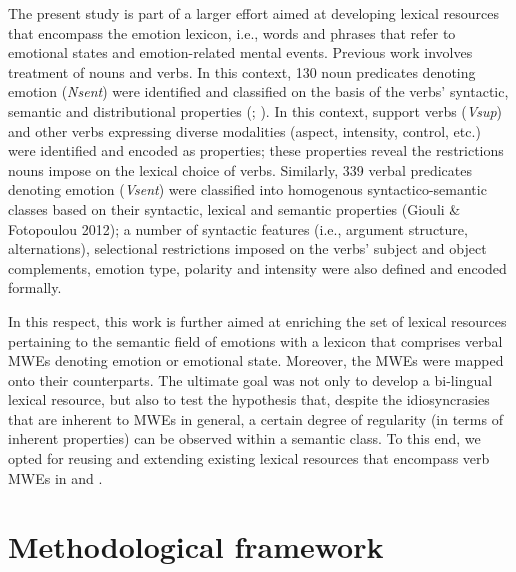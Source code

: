 \documentclass[output=paper]{langsci/langscibook}
\begin{document}
The present study is part of a larger effort aimed at developing lexical
resources that encompass the  emotion lexicon, i.e., words and
phrases that refer to emotional states and emotion-related mental
events. Previous work involves treatment of nouns and verbs. In this
context, 130  noun predicates denoting emotion (\textit{Nsent}) were
identified and classified on the basis of the verbs' syntactic, semantic and
distributional properties (\citealt{pantazara2008}; \citealt{fotopoulou2009}). In this context, support verbs (\textit{Vsup}) and other verbs
expressing diverse modalities (aspect, intensity, control, etc.) were
identified and encoded as properties; these properties reveal the
restrictions nouns impose on the lexical choice of verbs. Similarly,
339  verbal predicates denoting emotion (\textit{Vsent}) were
classified into homogenous syntactico-semantic classes based on their
syntactic, lexical and semantic properties (Giouli \& Fotopoulou 2012);
a number of syntactic features (i.e., argument structure,
alternations), selectional restrictions imposed on the verbs' subject and
object complements, emotion type, polarity and intensity were also
defined and encoded formally. 


In this respect, this work is further aimed at enriching the set
of lexical resources pertaining to the semantic field of emotions
with a lexicon that comprises verbal MWEs denoting emotion or emotional
state. Moreover, the  MWEs were mapped onto their  counterparts.
The ultimate goal was not only to develop a bi-lingual lexical
resource, but also to test the hypothesis that, despite the
idiosyncrasies that are inherent to MWEs in general, a certain degree
of regularity (in terms of inherent properties) can be observed within
a semantic class. To this end, we opted for reusing and extending
existing lexical resources that encompass verb MWEs in  and .

\section{Methodological framework}
\end{document}
